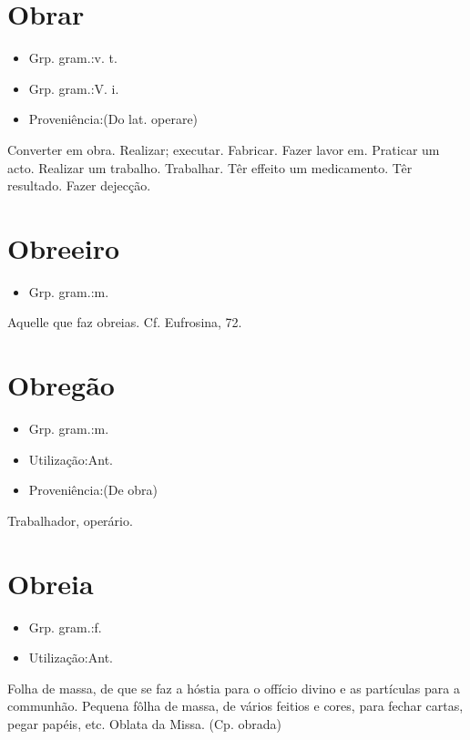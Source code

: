 \section{Obrar}
\begin{itemize}
\item {Grp. gram.:v. t.}
\end{itemize}
\begin{itemize}
\item {Grp. gram.:V. i.}
\end{itemize}
\begin{itemize}
\item {Proveniência:(Do lat. \textunderscore operare\textunderscore )}
\end{itemize}
Converter em obra.
Realizar; executar.
Fabricar.
Fazer lavor em.
Praticar um acto.
Realizar um trabalho.
Trabalhar.
Têr effeito um medicamento.
Têr resultado.
Fazer dejecção.
\section{Obreeiro}
\begin{itemize}
\item {Grp. gram.:m.}
\end{itemize}
Aquelle que faz obreias. Cf. \textunderscore Eufrosina\textunderscore , 72.
\section{Obregão}
\begin{itemize}
\item {Grp. gram.:m.}
\end{itemize}
\begin{itemize}
\item {Utilização:Ant.}
\end{itemize}
\begin{itemize}
\item {Proveniência:(De \textunderscore obra\textunderscore )}
\end{itemize}
Trabalhador, operário.
\section{Obreia}
\begin{itemize}
\item {Grp. gram.:f.}
\end{itemize}
\begin{itemize}
\item {Utilização:Ant.}
\end{itemize}
Folha de massa, de que se faz a hóstia para o offício divino e as partículas para a communhão.
Pequena fôlha de massa, de vários feitios e cores, para fechar cartas, pegar papéis, etc.
Oblata da Missa.
(Cp. \textunderscore obrada\textunderscore )
